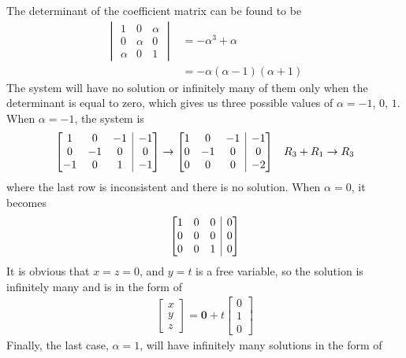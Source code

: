 \begin{Answer}
The determinant of the coefficient matrix can be found to be
\begin{align*}
\begin{vmatrix}
1 & 0 & \alpha \\
0 & \alpha & 0 \\
\alpha & 0 & 1
\end{vmatrix}
&= -\alpha^3 + \alpha \\
&= -\alpha(\alpha-1)(\alpha+1)
\end{align*}
The system will have no solution or infinitely many of them only when the determinant is equal to zero, which gives us three possible values of $\alpha = -1$, $0$, $1$. When $\alpha = -1$, the system is
\begin{align*}
\left[
\begin{array}{@{}ccc|c@{}}
1 & 0 & -1 & -1\\
0 & -1 & 0 & 0 \\
-1 & 0 & 1 & -1
\end{array}
\right]
&\to
\left[
\begin{array}{@{}ccc|c@{}}
1 & 0 & -1 & -1\\
0 & -1 & 0 & 0 \\
0 & 0 & 0 & -2
\end{array}
\right] & R_3 + R_1 \to R_3
\end{align*}
where the last row is inconsistent and there is no solution. When $\alpha = 0$, it becomes
\begin{align*}
\left[
\begin{array}{@{}ccc|c@{}}
1 & 0 & 0 & 0\\
0 & 0 & 0 & 0 \\
0 & 0 & 1 & 0
\end{array}
\right]
\end{align*}
It is obvious that $x = z = 0$, and $y = t$ is a free variable, so the solution is infinitely many and is in the form of
\begin{align*}
\begin{bmatrix}
x \\
y \\
z 
\end{bmatrix}
=
\textbf{0} +
t
\begin{bmatrix}
0 \\
1 \\
0
\end{bmatrix}
\end{align*}
Finally, the last case, $\alpha = 1$, will have infinitely many solutions in the form of 

\end{Answer}
